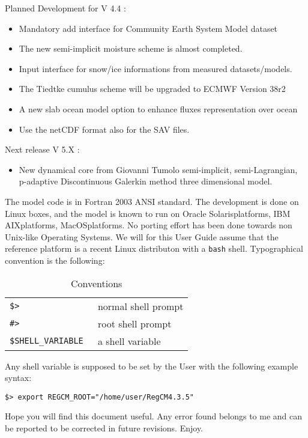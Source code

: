 Planned Development for V 4.4 :

\begin{itemize}
  \item Mandatory add interface for Community Earth System Model dataset
  \item The new semi-implicit moisture scheme is almost completed.
  \item Input interface for snow/ice informations from measured datasets/models.
  \item The Tiedtke cumulus scheme will be upgraded to ECMWF Version 38r2
  \item A new slab ocean model option to enhance fluxes representation over
    ocean
  \item Use the netCDF format also for the SAV files.
\end{itemize}

Next release V 5.X :

\begin{itemize}
  \item New dynamical core from Giovanni Tumolo semi-implicit, semi-Lagrangian,
   p-adaptive Discontinuous Galerkin method three dimensional model.
\end{itemize}

The model code is in Fortran 2003 ANSI standard.
The development is done on Linux boxes, and the model is known to run
on Oracle Solaris\texttrademark platforms, IBM AIX\texttrademark platforms,
MacOS\texttrademark platforms.
No porting effort has been done towards non Unix-like Operating Systems.
We will for this User Guide assume that the reference platform is a recent
Linux distributon with a \verb=bash= shell.
Typographical convention is the following:

\begin{table}[ht]
\caption{Conventions}
\vspace{0.05 in}
\centering
\begin{tabular}{l|l}
\hline
\verb=$> = & normal shell prompt \\
\verb=#> = & root shell prompt \\
\verb=$SHELL_VARIABLE = & a shell variable \\
\hline
\end{tabular}
\label{conventions}
\end{table}

Any shell variable is supposed to be set by the User with the following example
syntax:

\begin{Verbatim}
$> export REGCM_ROOT="/home/user/RegCM4.3.5"
\end{Verbatim}

Hope you will find this document useful. Any error found belongs to me and can
be reported to be corrected in future revisions. Enjoy.
